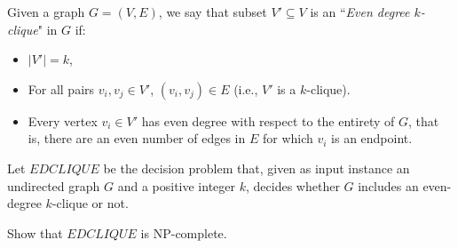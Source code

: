 \documentclass{cs0500}
\begin{document}
\newpage

\begin{problem}
Given a graph $G=(V,E)$, we say that subset $V'\subseteq V$ is an ``\emph{Even degree $k$-clique}" in $G$ if:
\begin{itemize}
    \item $|V'|=k$,
    \item For all pairs $v_i,v_j\in V'$, $(v_i,v_j)\in E$ (i.e., $V'$ is a $k$-clique).
    \item Every vertex $v_i\in V'$ has even degree with respect to the entirety of $G$, that is, there are an even number of edges in $E$ for which $v_i$ is an endpoint.
\end{itemize}
Let $EDCLIQUE$ be the decision problem that, given as input instance an undirected graph $G$ and a positive integer $k$, decides whether $G$ includes an even-degree $k$-clique or not.

Show that $\mathit{EDCLIQUE}$ is NP-complete.
\end{problem}

\begin{solution}
\end{solution}
\end{document}
